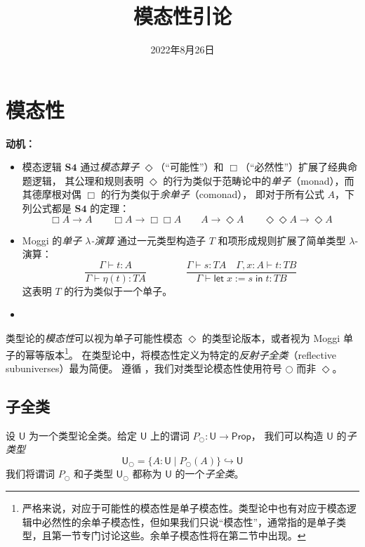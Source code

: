 \documentclass[UTF8]{ctexart}
\theoremstyle{definition}
\newcommand{\U}{\mathsf{U}}
\newcommand{\Prop}{\mathsf{Prop}}
\newcommand{\modal}{\bigcirc}
\begin{document}
\title{模态性引论}
\author{}
\date{2022年8月26日}
\maketitle

\section{模态性}

\textbf{动机：}
\begin{itemize}
    \item 模态逻辑 $\mathbf{S4}$ 通过\emph{模态算子} $\Diamond$（``可能性''）和 $\Box$（``必然性''）扩展了经典命题逻辑，
    其公理和规则表明 $\Diamond$ 的行为类似于范畴论中的\emph{单子}（monad），而其德摩根对偶 $\Box$ 的行为类似于\emph{余单子}（comonad），
    即对于所有公式 $A$，下列公式都是 $\mathbf{S4}$ 的定理：
    \[
    \Box A \to A \qquad \Box A \to \Box\Box A \qquad A \to \Diamond A \qquad \Diamond\Diamond A \to \Diamond A
    \]

    \item Moggi 的\emph{单子 $\lambda$-演算} \cite{Mog91} 通过一元类型构造子 $T$ 和项形成规则扩展了简单类型 $\lambda$-演算：
    \[
    \frac{\Gamma \vdash t : A}{\Gamma \vdash \eta(t) : TA}
    \qquad\qquad
    \frac{\Gamma \vdash s : TA \quad \Gamma, x:A \vdash t : TB}{\Gamma \vdash \mathsf{let}\; x := s \;\mathsf{in}\; t : TB}
    \]
    这表明 $T$ 的行为类似于一个单子。

    \item 
\end{itemize}

类型论的\emph{模态性}可以视为单子可能性模态 $\Diamond$ 的类型论版本，或者视为 Moggi 单子的幂等版本\footnote{严格来说，对应于可能性的模态性是单子模态性。类型论中也有对应于模态逻辑中必然性的余单子模态性，但如果我们只说``模态性''，通常指的是单子类型，且第一节专门讨论这些。余单子模态性将在第二节中出现。}。
在类型论中，将模态性定义为特定的\emph{反射子全类}（reflective subuniverses）最为简便。
遵循 \cite{RSS20,Uni13}，我们对类型论模态性使用符号 $\modal$ 而非 $\Diamond$。

\subsection{子全类}

设 $\U$ 为一个类型论全类。给定 $\U$ 上的谓词 $P_{\modal} : \U \to \Prop$，
我们可以构造 $\U$ 的\emph{子类型}
\[
\U_{\modal} = \{A : \U \mid P_{\modal}(A)\} \hookrightarrow \U
\]
我们将谓词 $P_{\modal}$ 和子类型 $\U_{\modal}$ 都称为 $\U$ 的一个\emph{子全类}。
\end{document}
